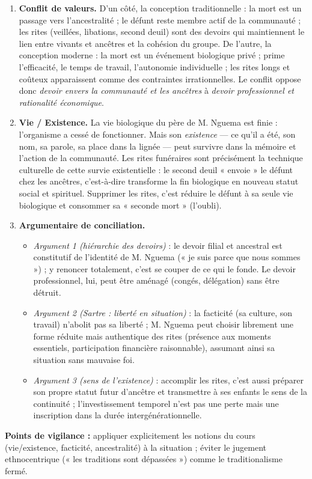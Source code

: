 \documentclass[11pt]{article}
\begin{document}
\begin{corrige}
\begin{enumerate}
\item \textbf{Conflit de valeurs.} D'un côté, la conception traditionnelle : la mort est un passage vers l'ancestralité ; le défunt reste membre actif de la communauté ; les rites (veillées, libations, second deuil) sont des devoirs qui maintiennent le lien entre vivants et ancêtres et la cohésion du groupe. De l'autre, la conception moderne : la mort est un événement biologique privé ; prime l'efficacité, le temps de travail, l'autonomie individuelle ; les rites longs et coûteux apparaissent comme des contraintes irrationnelles. Le conflit oppose donc \emph{devoir envers la communauté et les ancêtres} à \emph{devoir professionnel et rationalité économique}.
\item \textbf{Vie / Existence.} La vie biologique du père de M. Nguema est finie : l'organisme a cessé de fonctionner. Mais son \emph{existence} — ce qu'il a été, son nom, sa parole, sa place dans la lignée — peut survivre dans la mémoire et l'action de la communauté. Les rites funéraires sont précisément la technique culturelle de cette survie existentielle : le second deuil « envoie » le défunt chez les ancêtres, c'est-à-dire transforme la fin biologique en nouveau statut social et spirituel. Supprimer les rites, c'est réduire le défunt à sa seule vie biologique et consommer sa « seconde mort » (l'oubli).
\item \textbf{Argumentaire de conciliation.}
\begin{itemize}
\item \emph{Argument 1 (hiérarchie des devoirs)} : le devoir filial et ancestral est constitutif de l'identité de M. Nguema (« je suis parce que nous sommes ») ; y renoncer totalement, c'est se couper de ce qui le fonde. Le devoir professionnel, lui, peut être aménagé (congés, délégation) sans être détruit.
\item \emph{Argument 2 (Sartre : liberté en situation)} : la facticité (sa culture, son travail) n'abolit pas sa liberté ; M. Nguema peut choisir librement une forme réduite mais authentique des rites (présence aux moments essentiels, participation financière raisonnable), assumant ainsi sa situation sans mauvaise foi.
\item \emph{Argument 3 (sens de l'existence)} : accomplir les rites, c'est aussi préparer son propre statut futur d'ancêtre et transmettre à ses enfants le sens de la continuité ; l'investissement temporel n'est pas une perte mais une inscription dans la durée intergénérationnelle.
\end{itemize}
\end{enumerate}
\textbf{Points de vigilance :} appliquer explicitement les notions du cours (vie/existence, facticité, ancestralité) à la situation ; éviter le jugement ethnocentrique (« les traditions sont dépassées ») comme le traditionalisme fermé.
\end{corrige}
\end{document}
